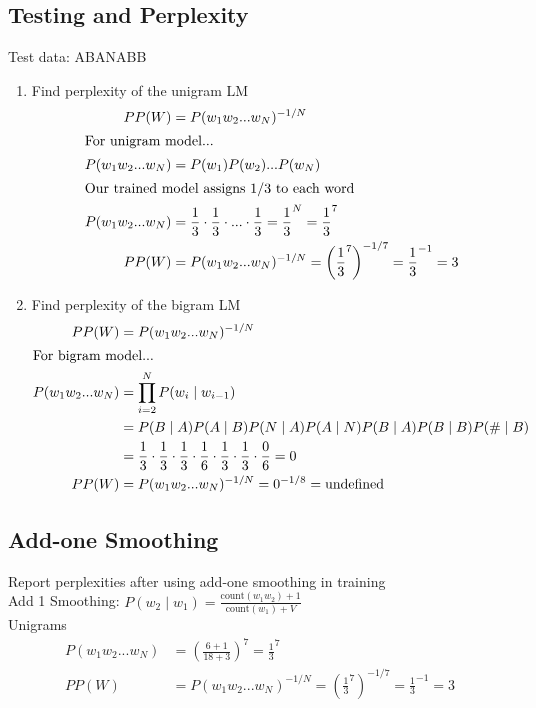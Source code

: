 \documentclass{article}
\begin{document}
\subsection{Testing and Perplexity}
Test data: ABANABB
\begin{enumerate}
  \item Find perplexity of the unigram LM
  \begin{align*}
    PP(W) &= P(w_1w_2...w_N)^{-1/N} \\
	\intertext{For unigram model...}
    P(w_1w_2...w_N) &= P(w_1)P(w_2)...P(w_N) \\
	\intertext{Our trained model assigns 1/3 to each word}
	P(w_1w_2...w_N) &= \frac{1}{3} \cdot \frac{1}{3} \cdot ... \cdot \frac{1}{3} = \frac{1}{3}^N = \frac{1}{3}^7 \\
	PP(W) &= P(w_1w_2...w_N)^{-1/N} = \left( \frac{1}{3}^7 \right)^{-1/7} = \frac{1}{3}^{-1} = 3
  \end{align*}

  \item Find perplexity of the bigram LM\\

  \begin{align*}
    PP(W) &= P(w_1w_2...w_N)^{-1/N} \\
	\intertext{For bigram model...}
	P(w_1w_2...w_N) &= \prod_{i=2}^{N} P(w_i \mid w_{i-1})\\
	&= P(B \mid A)P(A \mid B)P(N \mid A)P(A \mid N)P(B \mid A)P(B \mid B)P(\# \mid B) \\
	&= \frac{1}{3} \cdot \frac{1}{3} \cdot \frac{1}{3} \cdot \frac{1}{6} \cdot \frac{1}{3} \cdot \frac{1}{3} \cdot \frac{0}{6}  = 0\\
    PP(W) &= P(w_1w_2...w_N)^{-1/N} = 0^{-1/8} = \text{undefined}\\
  \end{align*}
\end{enumerate}

\subsection{Add-one Smoothing}
Report perplexities after using add-one smoothing in training\\
Add 1 Smoothing: $P(w_2 \mid w_1) = \frac{\text{count}(w_1w_2) + 1}{\text{count}(w_1) + V}$\\

Unigrams
\begin{align*}
  P(w_1w_2...w_N) &= \left( \frac{6 + 1}{18 + 3} \right)^7 = \frac{1}{3}^7 \\
  PP(W) &= P(w_1w_2...w_N)^{-1/N} = \left( \frac{1}{3}^7 \right)^{-1/7} = \frac{1}{3}^{-1} = 3
\end{align*}
\end{document}
